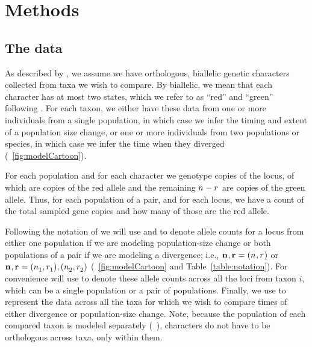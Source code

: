 \ifembed{

}{}


\section{Methods}

\subsection{The data}
As described by \citet{Oaks2018ecoevolity},
we assume we have orthologous, biallelic genetic characters collected from
taxa we wish to compare.
By biallelic, we mean that each character has at most two states,
which we refer to as ``red'' and ``green'' following \citet{Bryant2012}.
For each taxon, we either have these data from one or more individuals from a
single population, in which case we infer the timing and extent of a population
size change, or one or more individuals from two populations or species,
in which case we infer the time when they diverged (\fig{}~\ref{fig:modelCartoon}).

For each population and for each character we genotype \allelecount copies
of the locus, \redallelecount of which are copies of the red allele and the
remaining $\allelecount - \redallelecount$ are copies of the green allele.
Thus, for each population of a pair, and for each locus, we have a count of the
total sampled gene copies and how many of those are the red allele.

\ifembed{

}{}

Following the notation of \citet{Oaks2018ecoevolity}
we will use \leafallelecounts and \leafredallelecounts to denote allele counts
for a locus from either one population if we are modeling population-size
change or both populations of a pair if we are modeling a divergence; i.e., 
$\leafallelecounts, \leafredallelecounts = (\allelecount, \redallelecount)$
or
$\leafallelecounts, \leafredallelecounts = (\allelecount[1],
\redallelecount[1]), (\allelecount[2], \redallelecount[2])$
(\fig{}~\ref{fig:modelCartoon}
and
Table~\ref{table:notation}).
For convenience will use \comparisondata[i] to denote these allele counts
across all the loci from taxon $i$, which can be a single population
or a pair of populations.
Finally, we use \alldata to represent the data across all the taxa for which we
wish to compare times of either divergence or population-size change.
Note, because the population of each compared taxon is modeled separately
(\fig{}~),
characters do not have to be orthologous across taxa, only within them.


